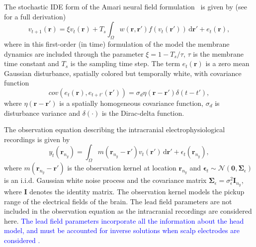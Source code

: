\documentclass[review,authoryear,3p]{elsarticle}
\newcommand{\parham}[1]{\textcolor{blue}{#1}}
\begin{document}
The stochastic IDE form of the Amari neural field formulation~\cite{Amari1977} is given by (see~\cite{Freestone2011} for a full derivation)
\begin{equation}\label{eq:DiscreteTimeModel}
	v_{t+1}\left(\mathbf{r}\right) = 
	\xi v_t\left(\mathbf{r}\right) + 
	T_s \int_\Omega { 
	    w\left(\mathbf{r},\mathbf{r'}\right)
	    f\left(v_t\left(\mathbf{r}'\right)\right) 
	\, \mathrm{d}\mathbf{r}'} 
	+ e_t\left(\mathbf{r}\right), 
\end{equation}
where in this first-order (in time) formulation of the model the membrane dynamics are included through the parameter $\xi=1-T_s/\tau$, $\tau$ is the membrane time constant and $T_s$ is the sampling time step. The term $e_t(\mathbf r)$ is a zero mean Gaussian disturbance, spatially colored but temporally white, with covariance function 
\begin{equation}
cov\left(e_{t}\left(\mathbf{r}\right),e_{t+t'}\left(\mathbf{r'}\right)\right)=\sigma_d\eta(\mathbf{r}-\mathbf{r'})\delta(t-t'),
\label{eq:FieldDisturbance}
\end{equation}
where $\eta(\mathbf{r}-\mathbf{r'})$ is a spatially homogeneous covariance function, $\sigma_d$ is disturbance variance and $\delta(\cdot)$ is the Dirac-delta function. %

The observation equation describing the intracranial electrophysiological recordings is given by
\begin{equation}\label{eq:ObservationEquation}
	y_t(\mathbf{r}_{n_y}) = \int_{\Omega} { m\left(\mathbf{r}_{n_y}-\mathbf{r}'\right) v_t\left(\mathbf{r}'\right) \, \mathrm{d}\mathbf{r}'} + \epsilon_t(\mathbf{r}_{n_y}), 
\end{equation}
where $m\left(\mathbf{r}_{n_y}-\mathbf{r}'\right)$ is the observation kernel at location $\mathbf{r}_{n_y}$ and  $\boldsymbol{\epsilon}_{t}\sim \mathcal{N}\left(\mathbf{0},\mathbf{\Sigma}_{\epsilon}\right)$  is an i.i.d. Gaussian white noise process and the covariance matrix $\mathbf{\Sigma}_{\epsilon}=\sigma^2_{\epsilon}\mathbf I_{n_y}$, where $\mathbf I$ denotes the identity matrix. The observation kernel models the pickup range of the electrical fields of the brain. The lead field parameters are not included in the observation equation as the intracranial recordings are considered here. \parham{The lead field parameters incorporate all the information about the head model, and must be accounted for inverse solutions when scalp electrodes are considered \cite{Jirsa2007}.} 
\end{document}
